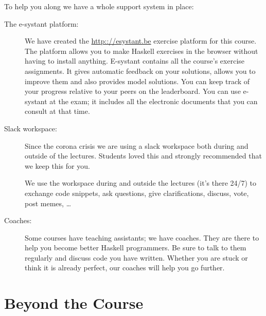 To help you along we have a whole support system in place:
\begin{description}
\item[The e-systant platform:]
We have created the \url{http:://esystant.be} exercise platform for this
course. The platform allows you to make Haskell exercises in the browser
without having to install anything. E-systant contains all the course's
exercise assignments. It gives automatic feedback on your solutions, allows
you to improve them and also provides model solutions. You can keep track
of your progress relative to your peers on the leaderboard.
You can use e-systant at the exam; it includes all the electronic documents that you can consult at that time.

\item[Slack workspace:]
Since the corona crisis we are using a slack workspace both during and
outside of the lectures. Students loved this and strongly recommended that we
keep this for you.

We use the workspace during and outside the lectures (it's there 24/7) to
exchange code snippets, ask questions, give clarifications, discuss, vote,
post memes, \ldots

\item[Coaches:]
Some courses have teaching assistants; we have coaches. They are there
to help you become better Haskell programmers. Be sure to talk to them
regularly and discuss code you have written. Whether you are stuck or
think it is already perfect, our coaches will help you go further.

\end{description}

\section{Beyond the Course}

